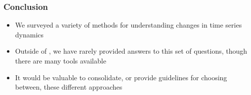 \documentclass{beamer}
\begin{document}
\begin{frame}
  \frametitle{Conclusion}
 \begin{itemize}
 \item We surveyed a variety of methods for understanding changes in time series
   dynamics
\item Outside of \citep{digiulio2015temporal}, we have rarely provided answers to this
  set of questions, though there are many tools available
\item It would be valuable to consolidate, or provide guidelines for choosing
  between, these different approaches

 \end{itemize} 
\end{frame} 


 
\end{document}
